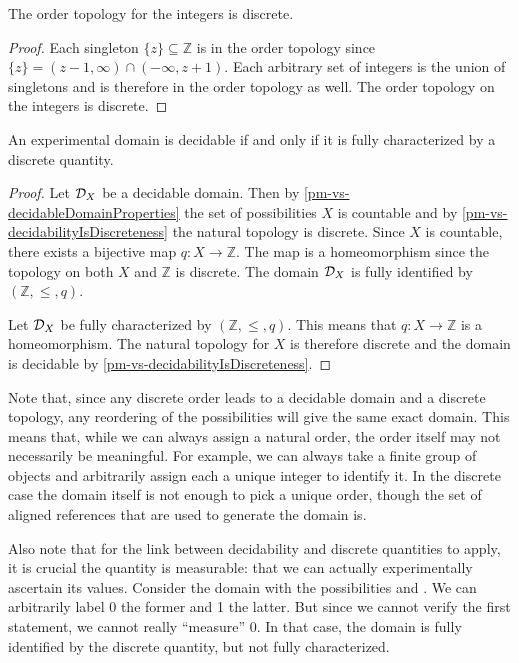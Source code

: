 \begin{mathSection}
	\begin{prop}
		The order topology for the integers is discrete.
	\end{prop}
	\begin{proof}
		Each singleton $\{z\} \subseteq \mathbb{Z}$ is in the order topology since $\{z\} = (z-1, \infty) \cap (-\infty, z+1)$. Each arbitrary set of integers is the union of singletons and is therefore in the order topology as well. The order topology on the integers is discrete.
	\end{proof}
	
	\begin{prop}
		An experimental domain is decidable if and only if it is fully characterized by a discrete quantity.
	\end{prop}
	
	\begin{proof}
		Let $\mathcal{D}_X$ be a decidable domain. Then by \ref{pm-vs-decidableDomainProperties} the set of possibilities $X$ is countable and by \ref{pm-vs-decidabilityIsDiscreteness} the natural topology is discrete. Since $X$ is countable, there exists a bijective map $q: X \to \mathbb{Z}$. The map is a homeomorphism since the topology on both $X$ and $\mathbb{Z}$ is discrete. The domain $\mathcal{D}_X$ is fully identified by $(\mathbb{Z}, \leq, q)$.
		
		Let $\mathcal{D}_X$ be fully characterized by $(\mathbb{Z}, \leq, q)$. This means that $q : X \to \mathbb{Z}$ is a homeomorphism. The natural topology for $X$ is therefore discrete and the domain is decidable by \ref{pm-vs-decidabilityIsDiscreteness}.
	\end{proof}	
	
\end{mathSection}

Note that, since any discrete order leads to a decidable domain and a discrete topology, any reordering of the possibilities will give the same exact domain. This means that, while we can always assign a natural order, the order itself may not necessarily be meaningful. For example, we can always take a finite group of objects and arbitrarily assign each a unique integer to identify it. In the discrete case the domain itself is not enough to pick a unique order, though the set of aligned references that are used to generate the domain is.

Also note that for the link between decidability and discrete quantities to apply, it is crucial the quantity is measurable: that we can actually experimentally ascertain its values. Consider the domain with the possibilities  and . We can arbitrarily label 0 the former and 1 the latter. But since we cannot verify the first statement, we cannot really ``measure'' 0. In that case, the domain is fully identified by the discrete quantity, but not fully characterized.

